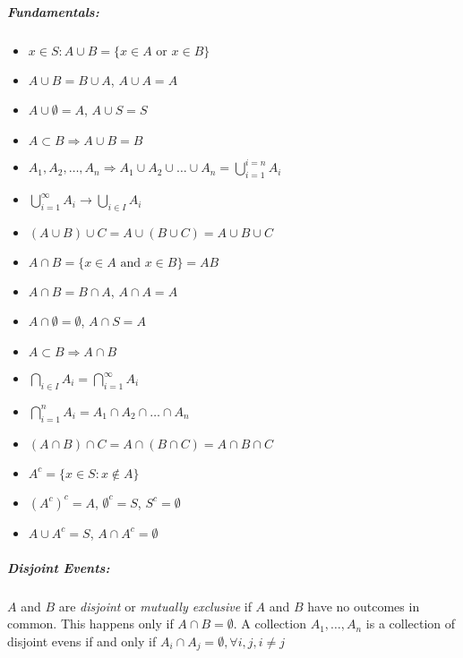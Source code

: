 \documentclass[landscape,10pt]{article}
\begin{document}
    \footnotesize
    \begin{multicols}{4}
    \setlength{\premulticols}{1pt}
    \setlength{\postmulticols}{1pt}
    \setlength{\multicolsep}{1pt}
    \setlength{\columnsep}{2pt}

    \subparagraph*{Fundamentals: } 
        \begin{itemize}[noitemsep]
            \item[] \(x \in S: A \cup B= \{x \in A \text{ or } x \in B\}\)
            \item[] \(A \cup B = B \cup A\), \(A \cup A = A\)
            \item[] \(A \cup \emptyset = A\), \(A \cup S = S \)
            \item[] \(A \subset B \Rightarrow A \cup B = B\)
            \item[] \(A_1, A_2, \dots, A_n \Rightarrow A_1 \cup A_2 \cup \dots \cup A_n = \bigcup\limits_{i=1}^{i=n} A_i\)
            \item[] \(\bigcup\limits_{i=1}^{\infty} A_i \rightarrow \bigcup\limits_{i\in I}A_i\)
            \item[] \((A \cup B) \cup C = A \cup (B \cup C) = A \cup B \cup C \)
            \item[] \( A \cap B = \{ x \in A \text{ and } x \in B\} = AB \)
            \item[] \(A \cap B = B \cap A \), \(A \cap A = A \)
            \item[] \(A \cap \emptyset = \emptyset \), \(A \cap S = A\)
            \item[] \(A \subset B \Rightarrow A \cap B\)
            \item[] \(\bigcap\limits_{i\in I}A_i = \bigcap\limits_{i=1}^{\infty}A_i\)
            \item[] \(\bigcap\limits_{i=1}^{n}A_i = A_1 \cap A_2 \cap \dots \cap A_n \)
            \item[] \( (A \cap B) \cap C = A \cap (B \cap C) = A \cap B \cap C\)
            \item[] \(A^c = \{x \in S: x \notin A\}\)
            \item[] \((A^c)^c = A\), \(\emptyset^c = S\), \(S^c = \emptyset\)
            \item[] \(A\cup A^c = S\), \(A \cap A^c = \emptyset\)
        \end{itemize}

    \subparagraph*{Disjoint Events: } 
        \(A\) and \(B\) are \textit{disjoint} or \textit{mutually exclusive} if \(A\) and \(B\) have no outcomes in common. This happens only if \(A \cap B = \emptyset \). A collection \(A_1, \dots, A_n\) is a collection of disjoint evens if and only if \(A_i \cap A_j = \emptyset, \forall i, j, i \neq j\)


\end{multicols}
\end{document}
